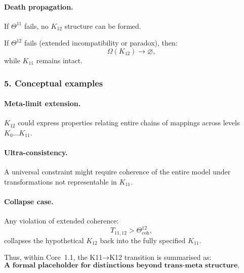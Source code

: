 \paragraph{Death propagation.}
If $\Theta^{11}$ fails, no $K_{12}$ structure can be formed.

If $\Theta^{12}$ fails (extended incompatibility or paradox), then:
\[
\Omega(K_{12}) \rightarrow \varnothing,
\]
while $K_{11}$ remains intact.

\subsubsection{5. Conceptual examples}

\paragraph{Meta-limit extension.}
$K_{12}$ could express properties relating entire chains of mappings across
levels $K_0\dots K_{11}$.

\paragraph{Ultra-consistency.}
A universal constraint might require coherence of the entire model under
transformations not representable in $K_{11}$.

\paragraph{Collapse case.}
Any violation of extended coherence:
\[
T_{11,12} > \Theta^{12}_{\mathrm{coh}},
\]
collapses the hypothetical $K_{12}$ back into the fully specified $K_{11}$.

Thus, within Core~1.1, the K11→K12 transition is summarised as:
\[
\textbf{A formal placeholder for distinctions beyond trans-meta structure,
ensuring that the cross-level architecture remains open-ended while
respecting all continuity and dimensional axioms.}
\]
